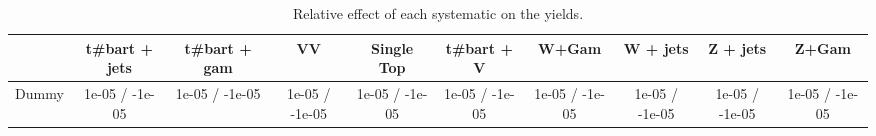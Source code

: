 \begin{table}[htbp]
\begin{center}
\footnotesize
\begin{tabular}{|c|c|c|c|c|c|c|c|c|c|}
\hline 
      & t#bar{t} + jets      & t#bar{t} +  gam      & VV      & Single Top      & t#bar{t} + V      & W+Gam      & W + jets      & Z + jets      & Z+Gam \\ 
\hline 
  Dummy & 1e-05 / -1e-05 & 1e-05 / -1e-05 & 1e-05 / -1e-05 & 1e-05 / -1e-05 & 1e-05 / -1e-05 & 1e-05 / -1e-05 & 1e-05 / -1e-05 & 1e-05 / -1e-05 & 1e-05 / -1e-05 \\ 
\hline 
\end{tabular} 
\caption{Relative effect of each systematic on the yields.} 
\end{center} 
\end{table} 
